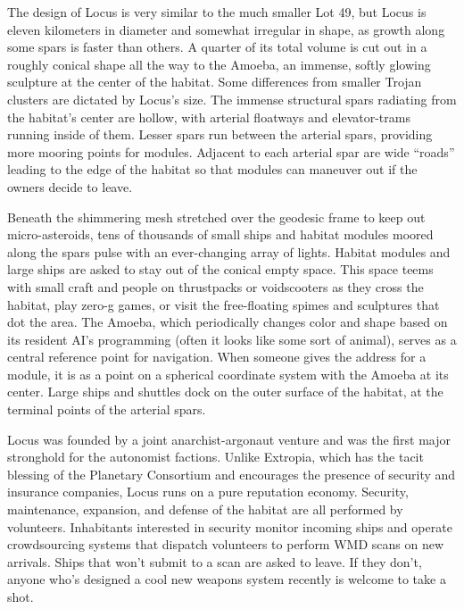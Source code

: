 The design of Locus is very similar to the much 
smaller Lot 49, but Locus is eleven kilometers in diameter and somewhat irregular in shape, as growth 
along some spars is faster than others. A quarter of its 
total volume is cut out in a roughly conical shape all 
the way to the Amoeba, an immense, softly glowing 
sculpture at the center of the habitat. Some differences 
from smaller Trojan clusters are dictated by Locus's 
size. The immense structural spars radiating from the 
habitat's center are hollow, with arterial floatways and 
elevator-trams running inside of them. Lesser spars 
run between the arterial spars, providing more mooring points for modules. Adjacent to each arterial spar 
are wide ``roads'' leading to the edge of the habitat so 
that modules can maneuver out if the owners decide 
to leave.

Beneath the shimmering mesh stretched over the 
geodesic frame to keep out micro-asteroids, tens of 
thousands of small ships and habitat modules moored 
along the spars pulse with an ever-changing array 
of lights. Habitat modules and large ships are asked 
to stay out of the conical empty space. This space 
teems with small craft and people on thrustpacks or 
voidscooters as they cross the habitat, play zero-g 
games, or visit the free-floating spimes and sculptures 
that dot the area. The Amoeba, which periodically 
changes color and shape based on its resident AI's 
programming (often it looks like some sort of animal), 
serves as a central reference point for navigation. 
When someone gives the address for a module, it is 
as a point on a spherical coordinate system with the 
Amoeba at its center. Large ships and shuttles dock on 
the outer surface of the habitat, at the terminal points 
of the arterial spars.

Locus was founded by a joint anarchist-argonaut 
venture and was the first major stronghold for 
the autonomist factions. Unlike Extropia, which 
has the tacit blessing of the Planetary Consortium 
and encourages the presence of security and insurance companies, Locus runs on a pure reputation 
economy. Security, maintenance, expansion, and 
defense of the habitat are all performed by volunteers. Inhabitants interested in security monitor 
incoming ships and operate crowdsourcing systems 
that dispatch volunteers to perform WMD scans on 
new arrivals. Ships that won't submit to a scan are 
asked to leave. If they don't, anyone who's designed 
a cool new weapons system recently is welcome to 
take a shot.

